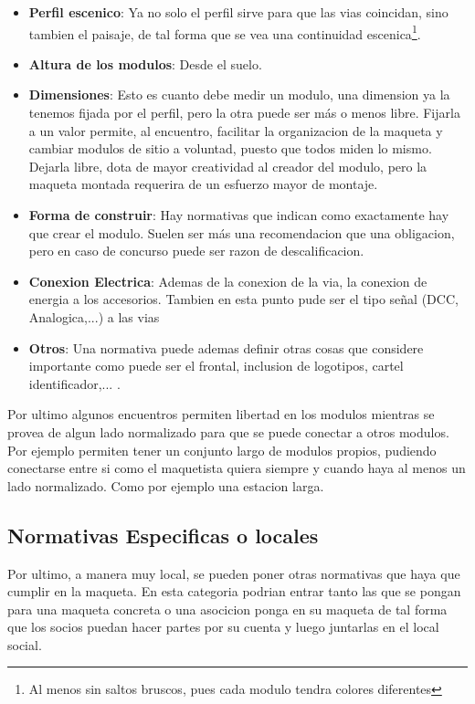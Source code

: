 \begin{itemize}
	\item \textbf{Perfil escenico}: Ya no solo el perfil sirve para que las vias coincidan, sino tambien el paisaje, de tal forma que se vea una continuidad escenica\footnote{Al menos sin saltos bruscos, pues cada modulo tendra colores diferentes}.
	\item \textbf{Altura de los modulos}: Desde el suelo.
	\item \textbf{Dimensiones}: Esto es cuanto debe medir un modulo, una dimension ya la tenemos fijada por el perfil, pero la otra puede ser más o menos libre. Fijarla a un valor permite, al encuentro, facilitar la organizacion de la maqueta y cambiar modulos de sitio a voluntad, puesto que todos miden lo mismo. Dejarla libre, dota de mayor creatividad al creador del modulo, pero la maqueta montada requerira de un esfuerzo mayor de montaje.
	\item \textbf{Forma de construir}: Hay normativas que indican como exactamente hay que crear el modulo. Suelen ser más una recomendacion que una obligacion, pero en caso de concurso puede ser razon de descalificacion. 
	\item \textbf{Conexion Electrica}: Ademas de la conexion de la via, la conexion de energia a los accesorios. Tambien en esta punto pude ser el tipo señal (DCC, Analogica,...) a las vias
	\item \textbf{Otros}: Una normativa puede ademas definir otras cosas que considere importante como puede ser el frontal, inclusion de logotipos, cartel identificador,... .

\end{itemize}

Por ultimo algunos encuentros permiten libertad en los modulos mientras se provea de algun lado normalizado para que se puede conectar a otros modulos.
Por ejemplo permiten tener un conjunto largo de modulos propios, pudiendo conectarse entre si como el maquetista quiera siempre y cuando haya al menos un lado normalizado. Como por ejemplo una estacion larga.
  
\subsection{Normativas Especificas o locales}
Por ultimo, a manera muy local, se pueden poner otras normativas que haya que cumplir en la maqueta. En esta categoria podrian entrar tanto las que se pongan para una maqueta concreta o una asocicion ponga en su maqueta de tal forma que los socios puedan hacer partes por su cuenta y luego juntarlas en el local social.

